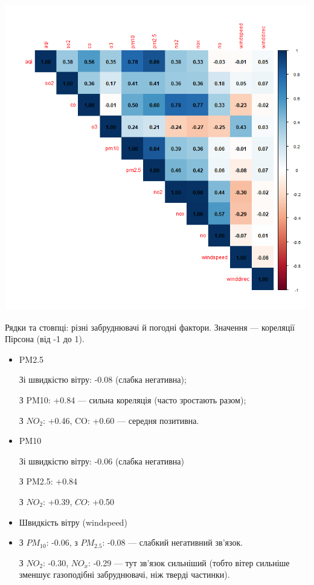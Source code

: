 \documentclass{article}
\begin{document}
\begin{enumerate}
    \includegraphics[width=6in]{question1/corr_matrix_plot.png}

    Рядки та стовпці: різні забруднювачі й погодні фактори. Значення — кореляції Пірсона (від -1 до 1).
    \begin{itemize}
        \item PM2.5

        Зі швидкістю вітру: -0.08 (слабка негативна);

        З PM10: +0.84 — сильна кореляція (часто зростають разом);

        З $NO_2$: +0.46, CO: +0.60 — середня позитивна.
    \item PM10
 
        Зі швидкістю вітру: -0.06 (слабка негативна)

        З PM2.5: +0.84

        З $NO_2$: +0.39, $CO$: +0.50

    \item Швидкість вітру (windspeed)
    \item 
        З $PM_{10}$: -0.06, з $PM_{2.5}$: -0.08 — слабкий негативний зв'язок.

        З $NO_2$: -0.30, $NO_x$: -0.29 — тут зв'язок сильніший (тобто вітер сильніше зменшує газоподібні забруднювачі, ніж тверді частинки).


\end{itemize}
\end{enumerate}
\end{document}
